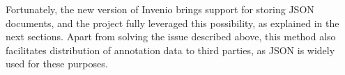 Fortunately, the new version of Invenio brings support for storing JSON
documents, and the project fully leveraged this possibility, as explained in the
next sections. Apart from solving the issue described above, this method also
facilitates distribution of annotation data to third parties, as JSON is widely
used for these purposes.
